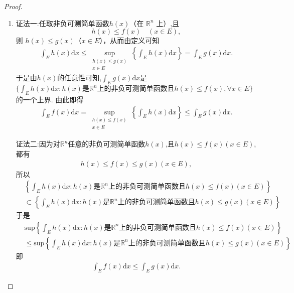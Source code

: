 \documentclass[../../main.tex]{subfiles}
\begin{document}
\begin{proof}
\begin{enumerate}[(1)]
\item {\color{blue}证法一:}任取非负可测简单函数\(h(x)\)（在 \(\mathbb{R}^n\) 上）,且
\[h(x)\leq f(x)\quad (x\in E),\]
则 \(h(x)\leq g(x)\)（\(x\in E\)），从而由定义可知
\begin{align*}
\int_{E}h(x)\mathrm{d}x\leqslant \sup_{\substack{h(x)\leq g(x)\\x\in E}}\left\{\int_{E}h(x)\mathrm{d}x\right\} = \int_{E}g(x)\mathrm{d}x.
\end{align*}
于是由$h(x)$的任意性可知,$\int_{E}g(x)\mathrm{d}x$是$\{\int_{E}h(x)\mathrm{d}x:h(x)\text{是}\mathbb{R}^n上的\text{非负可测简单函数且}h(x)\leqslant f(x),\forall x\in E\}$的一个上界.
由此即得
\begin{align*}
\int_{E}f(x)\mathrm{d}x=\sup_{\substack{h(x)\leq f(x)\\x\in E}}\left\{\int_{E}h(x)\mathrm{d}x\right\}\leqslant \int_{E}g(x)\mathrm{d}x.
\end{align*}

{\color{blue}证法二:}因为对$\mathbb{R}^n$任意的非负可测简单函数$h(x)$,且$h(x)\leqslant f(x)(x\in E)$,都有
\begin{align*}
h(x)\leqslant f(x)\leqslant g(x)(x\in E),
\end{align*}
所以
\begin{align*}
&\left\{ \int_E{h\left( x \right) \mathrm{d}x}:h\left( x \right) \text{是}\mathbb{R} ^n\text{上的非负可测简单函数且}h\left( x \right) \leqslant f\left( x \right) \left( x\in E \right) \right\} 
\\
&\subset \left\{ \int_E{h\left( x \right) \mathrm{d}x}:h\left( x \right) \text{是}\mathbb{R} ^n\text{上的非负可测简单函数且}h\left( x \right) \leqslant g\left( x \right) \left( x\in E \right) \right\} .
\end{align*}
于是
\begin{align*}
&\mathrm{sup}\left\{ \int_E{h\left( x \right) \mathrm{d}x}:h\left( x \right) \text{是}\mathbb{R} ^n\text{上的非负可测简单函数且}h\left( x \right) \leqslant f\left( x \right) \left( x\in E \right) \right\} 
\\
&\leqslant \mathrm{sup}\left\{ \int_E{h\left( x \right) \mathrm{d}x}:h\left( x \right) \text{是}\mathbb{R} ^n\text{上的非负可测简单函数且}h\left( x \right) \leqslant g\left( x \right) \left( x\in E \right) \right\}.
\end{align*}
即
\begin{align*}
\int_{E}f(x)\mathrm{d}x\leqslant \int_{E}g(x)\mathrm{d}x.
\end{align*}


\end{enumerate}
\end{proof}
\end{document}
